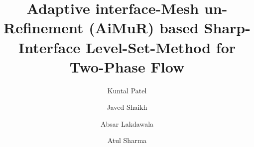 \documentclass[preprint,12pt]{elsarticle}
\begin{document}
\begin{frontmatter}



\title{Adaptive interface-Mesh un-Refinement (AiMuR) based Sharp-Interface Level-Set-Method for
 Two-Phase Flow}




\author[1,2]{Kuntal Patel}
\author[2]{Javed Shaikh}
\author[1]{Absar Lakdawala}
\author[2]{Atul Sharma }
\address[1]{Department of Mechanical Engineering, Nirma University, Ahmedabad, India.}
\address[2]{Department of Mechanical Engineering, Indian Institute of Technology Bombay, Mumbai, India.}


\end{frontmatter}
\end{document}
